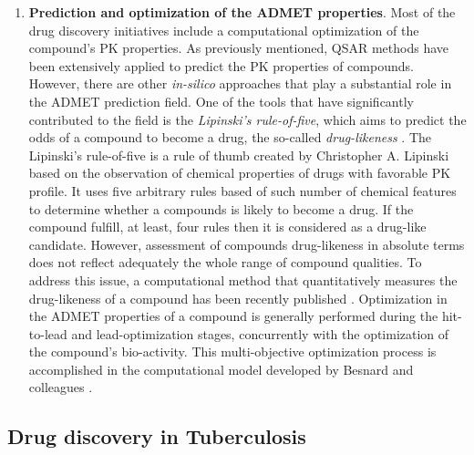 \documentclass[11pt, b5paper,twoside]{tesi_upf}
\begin{document}
{\begin{enumerate}
\item \textbf{Prediction and optimization of the ADMET properties}. Most of the drug discovery initiatives include a computational optimization of the compound's PK properties. As previously mentioned, QSAR methods have been extensively applied to predict the PK properties of compounds. However, there are other \textit{in-silico} approaches that play a substantial role in the ADMET prediction field.   One of the tools that have significantly contributed to the field is the \textit{Lipinski's rule-of-five}, which aims to predict the odds of a compound to become a drug, the so-called \textit{drug-likeness} \cite{Lipinski2004}. The Lipinski's rule-of-five is a rule of thumb created by Christopher A. Lipinski based on the observation of chemical properties of drugs with favorable PK profile. It uses five arbitrary rules based of such number of chemical features to determine whether a compounds is likely to become a drug. If the compound fulfill, at least, four rules then it is considered as a drug-like candidate. However, assessment of compounds drug-likeness in absolute terms does not reflect adequately the whole range of compound qualities. To address this issue, a computational method that quantitatively measures the drug-likeness of a compound has been recently published \cite{Bickerton2012}. Optimization in the ADMET properties of a compound is generally performed during the hit-to-lead and lead-optimization stages, concurrently with the optimization of the compound's bio-activity. This multi-objective optimization process is accomplished in the computational model developed by Besnard and colleagues \cite{Besnard2012b}.\end{enumerate}


\subsection{Drug discovery in Tuberculosis}}
\end{document}
